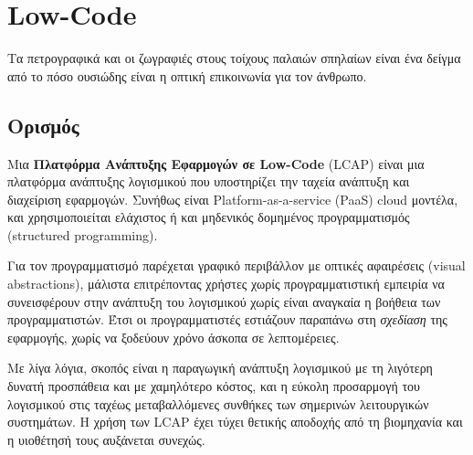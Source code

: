 \chapter{Low-Code}
    Τα πετρογραφικά και οι ζωγραφιές στους τοίχους παλαιών σπηλαίων είναι ένα δείγμα από το πόσο ουσιώδης είναι η οπτική επικοινωνία για τον άνθρωπο. \cite{CASEKuhn}


    \section{Ορισμός}
        Μια \textbf{Πλατφόρμα Ανάπτυξης Εφαρμογών σε Low-Code} (LCAP) είναι μια πλατφόρμα ανάπτυξης λογισμικού που υποστηρίζει την ταχεία ανάπτυξη και διαχείριση εφαρμογών. Συνήθως είναι Platform-as-a-service (PaaS) cloud μοντέλα, και χρησιμοποιείται ελάχιστος ή και μηδενικός δομημένος προγραμματισμός (structured \linebreak programming).

        Για τον προγραμματισμό παρέχεται γραφικό περιβάλλον με οπτικές αφαιρέσεις (visual abstractions), μάλιστα επιτρέποντας χρήστες χωρίς προγραμματιστική εμπειρία να συνεισφέρουν στην ανάπτυξη του λογισμικού χωρίς είναι αναγκαία η βοήθεια των προγραμματιστών. Έτσι οι προγραμματιστές εστιάζουν παραπάνω στη \textit{σχεδίαση} της εφαρμογής, χωρίς να ξοδεύουν χρόνο άσκοπα σε λεπτομέρειες.

        Με λίγα λόγια, σκοπός είναι η παραγωγική ανάπτυξη λογισμικού με τη λιγότερη δυνατή προσπάθεια και με χαμηλότερο κόστος, και η εύκολη προσαρμογή του λογισμικού στις ταχέως μεταβαλλόμενες συνθήκες των σημερινών λειτουργικών συστημάτων. Η χρήση των LCAP έχει τύχει θετικής αποδοχής από τη βιομηχανία και η υιοθέτησή τους αυξάνεται συνεχώς. \cite{Bock2021,Bucaioni2022,Sahay2020}

        \begin{displayquote} \justifying
             \cite{Ibm_2024}
        \end{displayquote}

